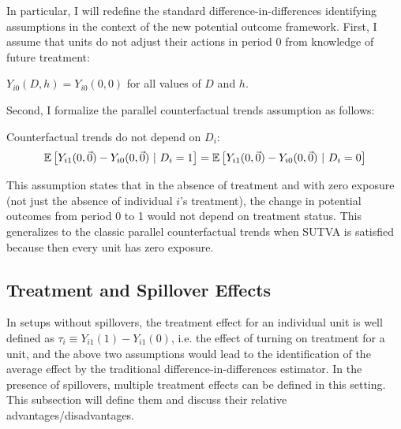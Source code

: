 \documentclass[11pt]{article}
\begin{document}
In particular, I will redefine the standard difference-in-differences identifying assumptions in the context of the new potential outcome framework. First, I assume that units do not adjust their actions in period $0$ from knowledge of future treatment:
\begin{assumption}[No Anticipation]\label{assumption:no-anticipation}
    $Y_{i0}(D, h) = Y_{i0}(0,0)$ for all values of $D$ and $h$.
\end{assumption}
Second, I formalize the parallel counterfactual trends assumption as follows:
\begin{assumption}\label{assumption:parallel}
    Counterfactual trends do not depend on $D_i$:
    \[ 
        \mathbb{E}\left[Y_{i1}(0, \vec{0}) - Y_{i0}(0, \vec{0}) \ \vert \ D_i = 1 \right] = 
        \mathbb{E}\left[Y_{i1}(0, \vec{0}) - Y_{i0}(0, \vec{0}) \ \vert \ D_i = 0 \right]
    \]
\end{assumption}
This assumption states that in the absence of treatment and with zero exposure (not just the absence of individual $i$'s treatment), the change in potential outcomes from period 0 to 1 would not depend on treatment status. This generalizes to the classic parallel counterfactual trends when SUTVA is satisfied because then every unit has zero exposure. 

\subsection{Treatment and Spillover Effects}

In setups without spillovers, the treatment effect for an individual unit is well defined as $\tau_i \equiv Y_{i1}(1) - Y_{i1}(0)$, i.e. the effect of turning on treatment for a unit, and the above two assumptions would lead to the identification of the average effect by the traditional difference-in-differences estimator. In the presence of spillovers, multiple treatment effects can be defined in this setting. This subsection will define them and discuss their relative advantages/disadvantages. 
\end{document}
